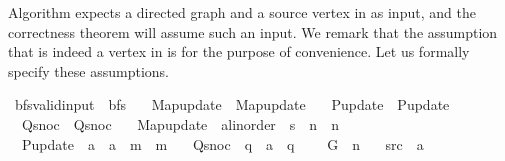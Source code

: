 \begin{isabellebody}
\isamarkuptrue%
%
\isamarkuptrue%
%
\endisatagdocument
{\isafolddocument}%
%
\isadelimdocument
%
\endisadelimdocument
%
\begin{isamarkuptext}%
Algorithm  expects a directed graph  and a source vertex  in
 as input, and the correctness theorem will assume such an input. We remark that the
assumption that  is indeed a vertex in  is for the purpose of convenience. Let
us formally specify these assumptions.%
\end{isamarkuptext}\isamarkuptrue%
\isamarkupfalse%
\ bfs{\isacharunderscore}{\kern0pt}valid{\isacharunderscore}{\kern0pt}input\ {\isacharequal}{\kern0pt}\ bfs\ \isanewline
\ \ Map{\isacharunderscore}{\kern0pt}update\ {\isacharequal}{\kern0pt}\ Map{\isacharunderscore}{\kern0pt}update\ \isanewline
\ \ P{\isacharunderscore}{\kern0pt}update\ {\isacharequal}{\kern0pt}\ P{\isacharunderscore}{\kern0pt}update\ \isanewline
\ \ Q{\isacharunderscore}{\kern0pt}snoc\ {\isacharequal}{\kern0pt}\ Q{\isacharunderscore}{\kern0pt}snoc\ \isanewline
\ \ Map{\isacharunderscore}{\kern0pt}update\ {\isacharcolon}{\kern0pt}{\isacharcolon}{\kern0pt}\ {\isachardoublequoteopen}{\isacharprime}{\kern0pt}a{\isacharcolon}{\kern0pt}{\isacharcolon}{\kern0pt}linorder\ {\isasymRightarrow}\ {\isacharprime}{\kern0pt}s\ {\isasymRightarrow}\ {\isacharprime}{\kern0pt}n\ {\isasymRightarrow}\ {\isacharprime}{\kern0pt}n{\isachardoublequoteclose}\ \isanewline
\ \ P{\isacharunderscore}{\kern0pt}update\ {\isacharcolon}{\kern0pt}{\isacharcolon}{\kern0pt}\ {\isachardoublequoteopen}{\isacharprime}{\kern0pt}a\ {\isasymRightarrow}\ {\isacharprime}{\kern0pt}a\ {\isasymRightarrow}\ {\isacharprime}{\kern0pt}m\ {\isasymRightarrow}\ {\isacharprime}{\kern0pt}m{\isachardoublequoteclose}\ \isanewline
\ \ Q{\isacharunderscore}{\kern0pt}snoc\ {\isacharcolon}{\kern0pt}{\isacharcolon}{\kern0pt}\ {\isachardoublequoteopen}{\isacharprime}{\kern0pt}q\ {\isasymRightarrow}\ {\isacharprime}{\kern0pt}a\ {\isasymRightarrow}\ {\isacharprime}{\kern0pt}q{\isachardoublequoteclose}\ {\isacharplus}{\kern0pt}\isanewline
\ \ \ G\ {\isacharcolon}{\kern0pt}{\isacharcolon}{\kern0pt}\ {\isacharprime}{\kern0pt}n\isanewline
\ \ \ src\ {\isacharcolon}{\kern0pt}{\isacharcolon}{\kern0pt}\ {\isacharprime}{\kern0pt}a\isanewline

\end{isabellebody}
